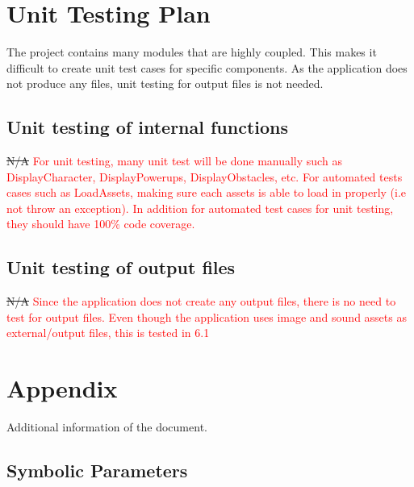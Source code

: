 \documentclass[12pt, titlepage]{article}
\begin{document}
\section{Unit Testing Plan}
The project contains many modules that are highly coupled. This makes it difficult to create unit test cases for specific components. As the application does not produce any files, unit testing for output files is not needed. 
\subsection{Unit testing of internal functions}
\sout{N/A} \textcolor{red}{For unit testing, many unit test will be done manually such as DisplayCharacter, DisplayPowerups, DisplayObstacles, etc. For automated tests cases such as LoadAssets, making sure each assets is able to load in properly (i.e not throw an exception). In addition for automated test cases for unit testing, they should have 100\% code coverage. } 
\subsection{Unit testing of output files}		
\sout{N/A} \textcolor{red}{Since the application does not create any output files, there is no need to test for output files. Even though the application uses image and sound assets as external/output files, this is tested in 6.1}

\newpage

\section{Appendix}
Additional information of the document.

\subsection{Symbolic Parameters}
\end{document}
